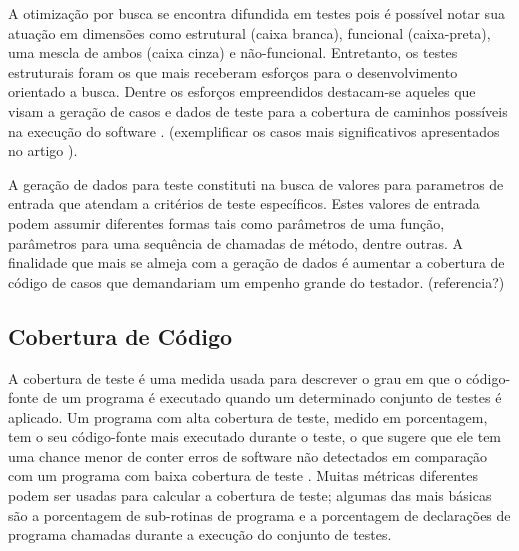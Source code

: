 
A otimização por busca se encontra difundida em testes pois é possível notar sua atuação em dimensões como estrutural (caixa branca), funcional (caixa-preta), uma mescla de ambos (caixa cinza) e não-funcional.  Entretanto, os testes estruturais foram os que mais receberam esforços para o desenvolvimento orientado a busca. Dentre os esforços empreendidos destacam-se aqueles que visam a geração de casos e dados de teste para a cobertura de caminhos possíveis na execução do software \cite{khari2017extensive}. (exemplificar os casos mais significativos apresentados no artigo \cite{khari2017extensive}).

A geração de dados para teste constituti na busca de valores para parametros de entrada que atendam a critérios de teste específicos. Estes valores de entrada podem assumir diferentes formas tais como parâmetros de uma função, parâmetros para uma sequência de chamadas de método, dentre outras. A finalidade que mais se almeja com a geração de dados é aumentar a cobertura de código de casos que demandariam um empenho grande do testador. (referencia?)

\subsection{Cobertura de Código}

A cobertura de teste é uma medida usada para descrever o grau em que o código-fonte de um programa é executado quando um determinado conjunto de testes é aplicado. Um programa com alta cobertura de teste, medido em porcentagem, tem o seu código-fonte mais executado durante o teste, o que sugere que ele tem uma chance menor de conter erros de software não detectados em comparação com um programa com baixa cobertura de teste \cite{yang2009survey}. Muitas métricas diferentes podem ser usadas para calcular a cobertura de teste; algumas das mais básicas são a porcentagem de sub-rotinas de programa e a porcentagem de declarações de programa chamadas durante a execução do conjunto de testes.

